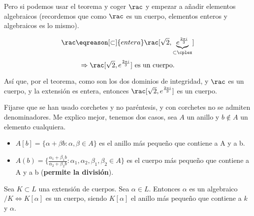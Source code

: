 	\begin{example}[3]
		Pero si podemos usar el teorema y coger $\rac$ y empezar a añadir elementos algebraicos (recordemos que como $\rac$ es un cuerpo, elementos enteros y algebraicos es lo mismo).

		\[ \rac \eqreason[\subset]{entera} \rac[\sqrt{2}, \underbrace{e^{\frac{2\pi i}{3}}}_{\subset \cplex}] \]
		\[ \Rightarrow \rac[\sqrt{2}, e^{\frac{2\pi i}{3}}] \text{ es un cuerpo.}\]

		Así que, por el teorema, como son los dos dominios de integridad, y $\rac$ es un cuerpo, y la extensión es entera, entonces $\rac[\sqrt{2}, e^{\frac{2\pi i}{3}}]$ es un cuerpo.
	\end{example}

	\notacion Fijarse que se han usado corchetes y no paréntesis, y con corchetes no se admiten denominadores. Me explico mejor, tenemos dos casos, sea $A$ un anillo y $b\notin A$ un elemento cualquiera. \label{notacion: 1}
	\begin{itemize}
		\item $A[b]=\{ \alpha+\beta b: \alpha, \beta \in A \}$ es el anillo más pequeño que contiene a A y a b.
		\item $A(b)=\{ \frac{\alpha_1+\beta_1 b}{\alpha_2+\beta_2 b}: \alpha_1, \alpha_2, \beta_1, \beta_2 \in A \}$ es el cuerpo más pequeño que contiene a A y a b (\textbf{permite la división}).
	\end{itemize}


	\begin{corol}\label{cor:1}
		Sea $K \subset L$ una extensión de cuerpos. Sea $\alpha \in L$. Entonces $\alpha$ es un algebraico$/K \Leftrightarrow K[\alpha]$ es un cuerpo, siendo $K[\alpha]$ el anillo más pequeño que contiene a $k$ y $\alpha$.
	\end{corol}

